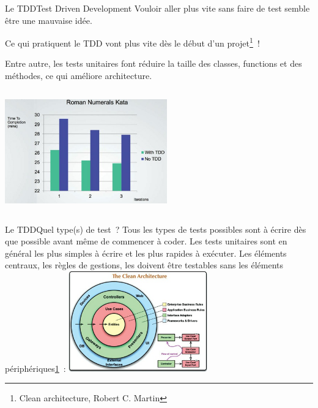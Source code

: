 \documentclass{beamer}
\begin{document}
    \begin{frame}{Le TDD}{Test Driven Development}
        Vouloir aller plus vite sans faire de test semble être une mauvaise idée.

        Ce qui pratiquent le TDD vont plus vite dès le début d'un projet\footnote{\label{cleanarchitecture}Clean architecture, Robert C. Martin}~!

        Entre autre, les tests unitaires font réduire la taille des classes, functions et des méthodes, ce qui améliore architecture.
        \begin{columns}
            \centering
            \includegraphics[width=7cm]{image/tdd-vs-no-tdd}
        \end{columns}
    \end{frame}

    \begin{frame}{Le TDD}{Quel type(s) de test~?}
        Tous les types de tests possibles sont à écrire dès que possible avant même de commencer à coder.
        Les tests unitaires sont en général les plus simples à écrire et les plus rapides à exécuter.
        \bigbreak
        Les éléments centraux, les règles de gestions, les  doivent être testables sans les éléments périphériques\cref{cleanarchitecture}~:
        \bigbreak
        \centering
        \includegraphics[width=6cm]{image/the-clean-architecture}
    \end{frame}
\end{document}
